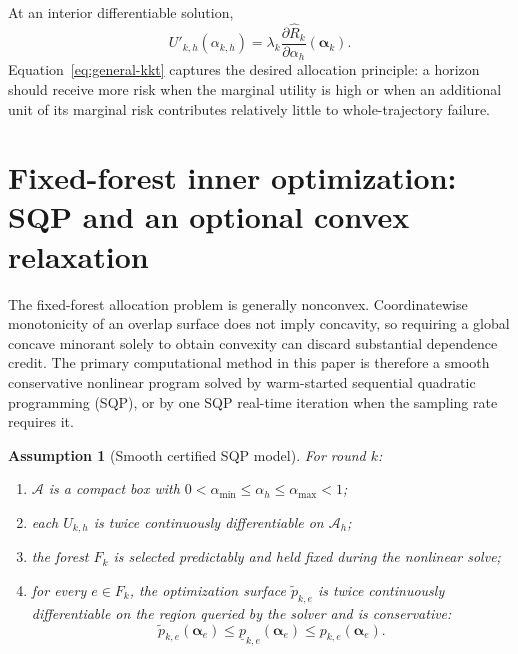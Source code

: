 \documentclass[11pt]{article}
\newtheorem{assumption}{Assumption}
\newcommand{\calA}{\mathcal{A}}
\newcommand{\riskhat}{\widehat R}
\begin{document}
At an interior differentiable solution,
\begin{equation}
    U'_{k,h}(\alpha_{k,h})
    =
    \lambda_k
    \frac{\partial \riskhat_k}{\partial\alpha_h}(\bm\alpha_k).
    \label{eq:general-kkt}
\end{equation}
Equation~\eqref{eq:general-kkt} captures the desired allocation principle: a horizon should receive more risk when the marginal utility is high or when an additional unit of its marginal risk contributes relatively little to whole-trajectory failure.

\section{Fixed-forest inner optimization: SQP and an optional convex relaxation}
\label{sec:convexity}

The fixed-forest allocation problem is generally nonconvex.  Coordinatewise
monotonicity of an overlap surface does not imply concavity, so requiring a
global concave minorant solely to obtain convexity can discard substantial
dependence credit.  The primary computational method in this paper is therefore
a smooth conservative nonlinear program solved by warm-started sequential
quadratic programming (SQP), or by one SQP real-time iteration when the sampling
rate requires it.

\begin{assumption}[Smooth certified SQP model]
\label{ass:sqp-model}
For round $k$:
\begin{enumerate}[leftmargin=*]
    \item $\calA$ is a compact box with
    $0<\alpha_{\min}\le\alpha_h\le\alpha_{\max}<1$;
    \item each $U_{k,h}$ is twice continuously differentiable on $\calA_h$;
    \item the forest $F_k$ is selected predictably and held fixed during the
    nonlinear solve;
    \item for every $e\in F_k$, the optimization surface
    $\widetilde p_{k,e}$ is twice continuously differentiable on the region
    queried by the solver and is conservative:
    \[
        \widetilde p_{k,e}(\bm\alpha_e)
        \le
        \underline p_{k,e}(\bm\alpha_e)
        \le
        p_{k,e}(\bm\alpha_e).
    \]
\end{enumerate}
\end{assumption}
\end{document}
